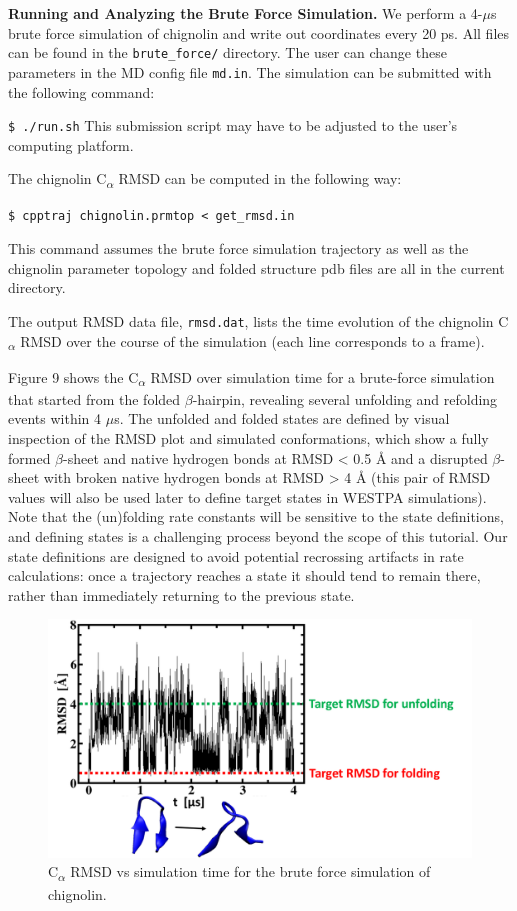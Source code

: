 \documentclass[9pt,tutorial,ASAPversion]{livecoms}
\begin{document}
\textbf{Running and Analyzing the Brute Force Simulation.} We perform a 4-$\mu$s brute force simulation of chignolin and write out coordinates every 20 ps. 
All files can be found in the \verb|brute_force/| directory. 
The user can change these parameters in the MD config file \verb|md.in|. 
The simulation can be submitted with the following command:
 
\verb|$ ./run.sh|
This submission script may have to be adjusted to the user’s computing platform.

The chignolin C\textsubscript{$\alpha$} RMSD can be computed in the following way:

\verb|$ cpptraj chignolin.prmtop < get_rmsd.in|

This command assumes the brute force simulation trajectory as well as the chignolin parameter topology and folded structure pdb files are all in the current directory.

The output RMSD data file, \verb|rmsd.dat|, lists the time evolution of the chignolin C\textsubscript{$\alpha$} RMSD over the course of the simulation (each line corresponds to a frame). 

Figure 9 shows the C\textsubscript{$\alpha$} RMSD over simulation time for a brute-force simulation that started from the folded $\beta$-hairpin, revealing several unfolding and refolding events within 4 $\mu$s. 
The unfolded and folded states are defined by visual inspection of the RMSD plot and simulated conformations, which show a fully formed $\beta$-sheet and native hydrogen bonds at RMSD < 0.5 \AA{} and a disrupted $\beta$-sheet with broken native hydrogen bonds at RMSD > 4 \AA{} (this pair of RMSD values will also be used later to define target states in WESTPA simulations).  
Note that the (un)folding rate constants will be sensitive to the state definitions, and defining states is a challenging process beyond the scope of this tutorial. 
Our state definitions are designed to avoid potential recrossing artifacts in rate calculations: once a trajectory reaches a state it should tend to remain there, rather than immediately returning to the previous state.
 

\begin{figure}
\includegraphics[width=\linewidth]{Figure9.png}
\caption{C\textsubscript{$\alpha$} RMSD vs simulation time for the brute force simulation of chignolin.}
\label{fig:view}
\end{figure}
\end{document}
